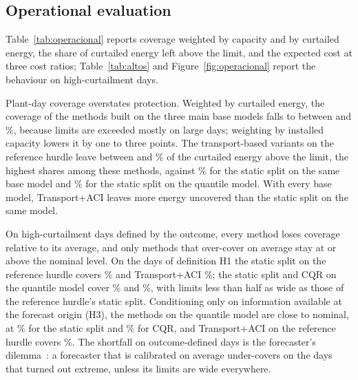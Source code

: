 

\subsection{Operational evaluation}
\label{sec:operacional}

Table~\ref{tab:operacional} reports coverage weighted by capacity and by curtailed energy, the share of curtailed energy left above the limit, and the expected cost at three cost ratios; Table~\ref{tab:altos} and Figure~\ref{fig:operacional} report the behaviour on high-curtailment days.

Plant-day coverage overstates protection. Weighted by curtailed energy, the coverage of the methods built on the three main base models falls to between  and \%, because limits are exceeded mostly on large days; weighting by installed capacity lowers it by one to three points. The transport-based variants on the reference hurdle leave between  and \% of the curtailed energy above the limit, the highest shares among these methods, against \% for the static split on the same base model and \% for the static split on the quantile model. With every base model, Transport+ACI leaves more energy uncovered than the static split on the same model.

On high-curtailment days defined by the outcome, every method loses coverage relative to its average, and only methods that over-cover on average stay at or above the nominal level. On the  days of definition H1 the static split on the reference hurdle covers \% and Transport+ACI \%; the static split and CQR on the quantile model cover \% and \%, with limits less than half as wide as those of the reference hurdle's static split. Conditioning only on information available at the forecast origin (H3), the methods on the quantile model are close to nominal, at \% for the static split and \% for CQR, and Transport+ACI on the reference hurdle covers \%. The shortfall on outcome-defined days is the forecaster's dilemma~\cite{lerch2017}: a forecaster that is calibrated on average under-covers on the days that turned out extreme, unless its limits are wide everywhere.

